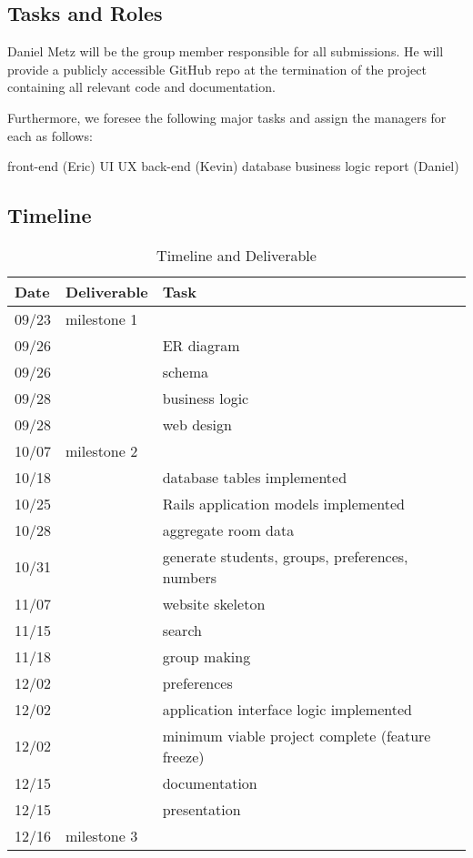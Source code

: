 \subsection{Tasks and Roles}
Daniel Metz will be the group member responsible for all submissions. He will
provide a publicly accessible GitHub repo at the termination of the project
containing all relevant code and documentation.

Furthermore, we foresee the following major tasks and assign the
managers for each as follows:


\begin{outline}
\1 front-end (Eric)
    \2 UI
    \2 UX
\1 back-end (Kevin)
    \2 database
    \2 business logic
\1 report (Daniel)
\end{outline}

\subsection{Timeline}

\begin{table}[h] \centering
\begin{tabular}{lll} \toprule
Date & Deliverable & Task \\ \midrule
09/23 & milestone 1  \\ \midrule
09/26 & ~ & ER diagram \\
09/26 & ~ & schema \\
09/28 & ~ & business logic \\
09/28 & ~ & web design \\ \midrule
10/07 & milestone 2  \\ \midrule
10/18 & ~ & database tables implemented \\
10/25 & ~ & Rails application models implemented \\
10/28 & ~ & aggregate room data \\
10/31 & ~ & generate students, groups, preferences, numbers \\
11/07 & ~ & website skeleton \\
11/15 & ~ & search \\
11/18 & ~ & group making \\
12/02 & ~ & preferences \\
12/02 & ~ & application interface logic implemented \\
12/02 & ~ & minimum viable project complete (feature freeze) \\
12/15 & ~ & documentation \\
12/15 & ~ & presentation \\ \midrule
12/16 & milestone 3 \\
\bottomrule
\end{tabular}
\caption{Timeline and Deliverable}
\end{table}